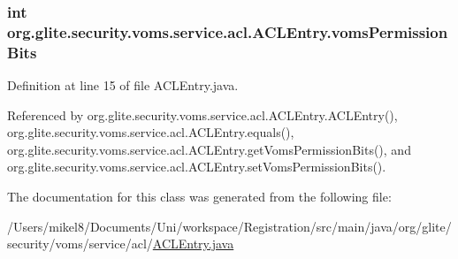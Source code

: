 \hypertarget{classorg_1_1glite_1_1security_1_1voms_1_1service_1_1acl_1_1ACLEntry_a77063368e74f27cc20884c2fd33448c4}{
\subsubsection[{vomsPermissionBits}]{\setlength{\rightskip}{0pt plus 5cm}int {\bf org.glite.security.voms.service.acl.ACLEntry.vomsPermissionBits}}}
\label{classorg_1_1glite_1_1security_1_1voms_1_1service_1_1acl_1_1ACLEntry_a77063368e74f27cc20884c2fd33448c4}


Definition at line 15 of file ACLEntry.java.



Referenced by org.glite.security.voms.service.acl.ACLEntry.ACLEntry(), org.glite.security.voms.service.acl.ACLEntry.equals(), org.glite.security.voms.service.acl.ACLEntry.getVomsPermissionBits(), and org.glite.security.voms.service.acl.ACLEntry.setVomsPermissionBits().



The documentation for this class was generated from the following file:\begin{DoxyCompactItemize}
\item 
/Users/mikel8/Documents/Uni/workspace/Registration/src/main/java/org/glite/security/voms/service/acl/\hyperlink{service_2acl_2ACLEntry_8java}{ACLEntry.java}\end{DoxyCompactItemize}
